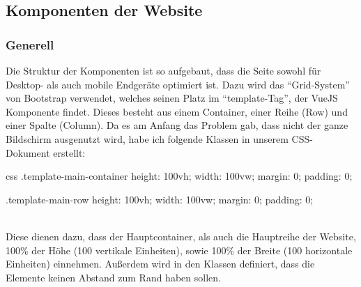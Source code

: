 \newpage
\subsection{Komponenten der Website}
\subsubsection{Generell}
Die Struktur der Komponenten ist so aufgebaut, dass die Seite sowohl für Desktop- als auch mobile Endgeräte optimiert ist. Dazu wird das \enquote{Grid-System} von Bootstrap verwendet, welches seinen Platz im \enquote{template-Tag}, der VueJS Komponente findet. Dieses besteht aus einem Container, einer Reihe (Row) und einer Spalte (Column). Da es am Anfang das Problem gab, dass nicht der ganze Bildschirm ausgenutzt wird, habe ich folgende Klassen in unserem CSS-Dokument erstellt:
\begin{code}{css}
	.template-main-container {
		height: 100vh;
		width: 100vw;
		margin: 0;
		padding: 0;
	}
	
	.template-main-row {
		height: 100vh;
		width: 100vw;
		margin: 0;
		padding: 0;
	}
\end{code}
	\label{list:cssmaincont} ~\\
Diese dienen dazu, dass der Hauptcontainer, als auch die Hauptreihe der Website, 100\% der Höhe (100 vertikale Einheiten), sowie 100\% der Breite (100 horizontale Einheiten) einnehmen. Außerdem wird in den Klassen definiert, dass die Elemente keinen Abstand zum Rand haben sollen.
\newpage
